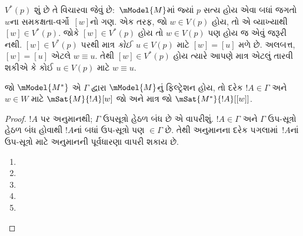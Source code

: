 $V^*(p)$ શું છે તે વિચારવા જેવું છે:~$\mModel{M}$માં જ્યાં $p$
સત્ય હોય એવા બધાં જગતો~$w$ના સમકક્ષતા-વર્ગો~$[w]$નો ગણ.
એક તરફ, જો $w \in V(p)$ હોય, તો એ વ્યાખ્યાથી $[w] \in
V^*(p)$. જોકે $[w] \in V^*(p)$ હોય તો $w \in V(p)$ પણ હોય જ એવું
જરૂરી નથી. $[w] \in V^*(p)$ પરથી માત્ર \emph{કોઈ}~$u \in V(p)$
માટે $[w] = [u]$ મળે છે. અલબત્ત, $[w] = [u]$ એટલે
$w \equiv u$. તેથી $[w] \in V^*(p)$ હોય ત્યારે આપણે
માત્ર એટલું તારવી શકીએ કે કોઈ $u \in V(p)$ માટે $w \equiv u$.

\begin{thm}
  જો $\mModel{M^*}$ એ $\Gamma$ દ્વારા $\mModel{M}$નું ફિલ્ટ્રેશન
  હોય, તો દરેક $!A \in \Gamma$ અને $w \in W$ માટે
  $\mSat{M}{!A}[w]$ જો અને માત્ર જો
  $\mSat{M^*}{!A}[{[w]}]$.
\end{thm}

\begin{proof}
  $!A$ પર અનુમાનથી; $\Gamma$ ઉપસૂત્રો હેઠળ બંધ છે એ વાપરીશું.
  $!A \in \Gamma$ અને $\Gamma$ ઉપ-સૂત્રો હેઠળ બંધ હોવાથી
  $!A$નાં બધાં ઉપ-સૂત્રો પણ $\in \Gamma$ છે. તેથી
  અનુમાનના દરેક પગલામાં~$!A$નાં ઉપ-સૂત્રો માટે અનુમાનની
  પૂર્વધારણા વાપરી શકાય છે.
  \begin{enumerate}
    \item {}
    \item {}
    \item {}

    \item {}

    \item {}


\end{enumerate}
\end{proof}
